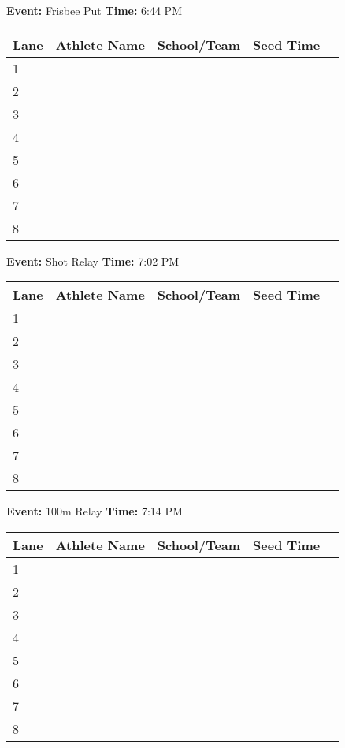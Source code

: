 \documentclass[11pt]{article}
\begin{document}
\textbf{Event:} Frisbee Put \quad \textbf{Time:} 6:44 PM 

\vspace{1em}
\begin{tabular}{@{}lllll@{}}
\toprule
\textbf{Lane} & \textbf{Athlete Name} & \textbf{School/Team} & \textbf{Seed Time} \\
\midrule
1 & & & \\
2 & & & \\
3 & & & \\
4 & & & \\
5 & & & \\
6 & & & \\
7 & & & \\
8 & & & \\
\bottomrule
\end{tabular}
\vspace{2.5em}


\textbf{Event:} Shot Relay \quad \textbf{Time:} 7:02 PM 

\vspace{1em}
\begin{tabular}{@{}lllll@{}}
\toprule
\textbf{Lane} & \textbf{Athlete Name} & \textbf{School/Team} & \textbf{Seed Time} \\
\midrule
1 & & & \\
2 & & & \\
3 & & & \\
4 & & & \\
5 & & & \\
6 & & & \\
7 & & & \\
8 & & & \\
\bottomrule
\end{tabular}
\vspace{2.5em}


\textbf{Event:} 100m Relay \quad \textbf{Time:} 7:14 PM 

\vspace{1em}
\begin{tabular}{@{}lllll@{}}
\toprule
\textbf{Lane} & \textbf{Athlete Name} & \textbf{School/Team} & \textbf{Seed Time} \\
\midrule
1 & & & \\
2 & & & \\
3 & & & \\
4 & & & \\
5 & & & \\
6 & & & \\
7 & & & \\
8 & & & \\
\bottomrule
\end{tabular}
\vspace{2.5em}
\end{document}
